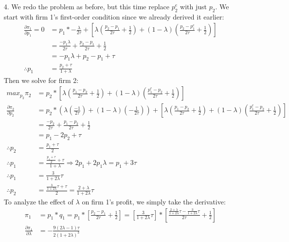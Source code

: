 \documentclass[12pt,letterpaper]{article}
\begin{document}
\begin{enumerate}
\begin{enumerate}
	\item[4.] We redo the problem as before, but this time replace $p_2^e$ with just $p_2$. We start with firm 1's first-order condition since we already derived it earlier:
	\begin{align*}
		\frac{\partial \pi_1}{\partial p_1} = 0 &= p_1 * - \frac{\lambda}{2\tau} + [\lambda(\frac{p_2-p_1}{2\tau} + \frac{1}{2}) + (1-\lambda)(\frac{p_2 - p_1^e}{2\tau} + \frac{1}{2})] \\
		&= \frac{-p_1\lambda}{2\tau} + \frac{p_2-p_1}{2\tau} + \frac{1}{2} \\
		&= -p_1\lambda + p_2 - p_1 + \tau \\
		\therefore p_1 &= \frac{p_2 + \tau}{1 + \lambda}
	\end{align*} 
	Then we solve for firm 2:
	\begin{align*}
		max_{p_2} \pi_2 &= p_2 * [\lambda(\frac{p_1 - p_2}{2\tau} + \frac{1}{2}) + (1-\lambda)(\frac{p_1^e - p_2}{2\tau} + \frac{1}{2})] \\
		\frac{\partial \pi_2}{\partial p_2} &= p_2 * (\lambda(\frac{-1}{2\tau}) + (1-\lambda)(-\frac{1}{2\tau})) + [\lambda(\frac{p_1 - p_2}{2\tau} + \frac{1}{2}) + (1-\lambda)(\frac{p_1^e - p_2}{2\tau} + \frac{1}{2})] \\
		&= \frac{-p_2}{2\tau} + \frac{p_1 - p_2}{2\tau} + \frac{1}{2} \\
		&= p_1 - 2p_2 + \tau \\
		\therefore p_2 &= \frac{p_1 + \tau}{2} \\
		\therefore p_1 &= \frac{\frac{p_1 + \tau}{2} + \tau}{1 + \lambda} \Rightarrow 2p_1 + 2p_1\lambda = p_1 + 3\tau \\
		\therefore p_1 &= \frac{3}{1 + 2\lambda} \tau \\
		\therefore p_2 &= \frac{\frac{3}{1 + 2\lambda} \tau + \tau}{2} = \frac{2 + \lambda}{1 + 2\lambda}\tau
	\end{align*}
	To analyze the effect of $\lambda$ on firm 1's profit, we simply take the derivative:
	\begin{align*}
		\pi_1 &= p_1*q_1 = p_1 * [\frac{p_2 - p_1}{2\tau} + \frac{1}{2}] = [\frac{3}{1 + 2\lambda} \tau] * [\frac{\frac{2 + \lambda}{1 + 2\lambda}\tau - \frac{3}{1 + 2\lambda} \tau}{2\tau} + \frac{1}{2}] \\
		\frac{\partial \pi_1}{\partial \lambda} &= -\frac{9(2\lambda-1)\tau}{2(1+2\lambda)^3}
	\end{align*}
\end{enumerate} 


\end{enumerate}
	
\end{document}
